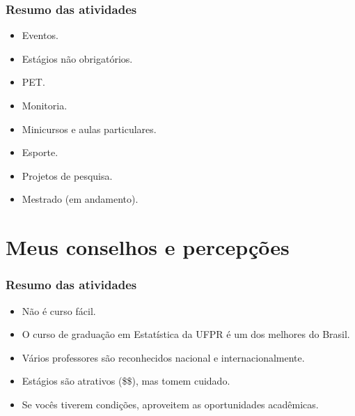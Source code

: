 \documentclass[10pt,
  aspectratio=169,
  serif,
  mathserif,
  professionalfont,
  compress,
  handout,
  ]{beamer}\usepackage[]{graphicx}\usepackage[]{color}
\begin{document}
\begin{frame}

\frametitle{Resumo das atividades}

  \begin{itemize}
  
    \itemsep 1ex
  
  \item Eventos. 
  
  \item Estágios não obrigatórios.
  
  \item PET.
  
  \item Monitoria.
  
  \item Minicursos e aulas particulares.
  
  \item Esporte.
  
  \item Projetos de pesquisa.
  
  \item Mestrado (em andamento).

  \end{itemize}
\end{frame}


\section{Meus conselhos e percepções}

\begin{frame}

\frametitle{Resumo das atividades}

  \begin{itemize}
  
    \itemsep 2ex
  
  \item Não é curso fácil.

  \item O curso de graduação em Estatística da UFPR é um dos melhores do Brasil.

  \item Vários professores são reconhecidos nacional e internacionalmente.

  \item Estágios são atrativos (\$\$), mas tomem cuidado.

  \item Se vocês tiverem condições, aproveitem as oportunidades acadêmicas. 
  

  \end{itemize}
\end{frame}
\end{document}

